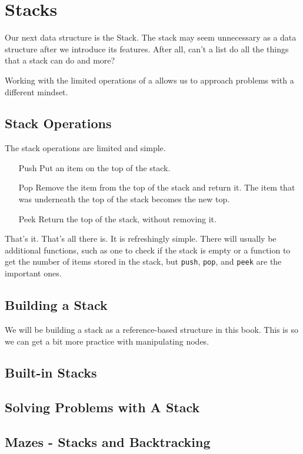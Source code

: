 \chapter{Stacks}
Our next data structure is the Stack.
The stack may seem unnecessary as a data structure after we introduce its features.  
After all, can't a list do all the things that a stack can do and more? 

Working with the limited operations of a allows us to approach problems with a different mindset.

\section{Stack Operations}

The stack operations are limited and simple. 


\begin{enumerate}
	\item[Push] Put an item on the top of the stack.
	\item[Pop]  Remove the item from the top of the stack and return it.  The item that was underneath the top of the stack becomes the new top.
	\item[Peek] Return the top of the stack, without removing it.
\end{enumerate}


That's it.  That's all there is.  It is refreshingly simple.
There will usually be additional functions, such as one to check if the stack is empty or a function to get the number of items stored in the stack, but \texttt{push}, \texttt{pop}, and \texttt{peek} are the important ones.




\section{Building a Stack}

We will be building a stack as a reference-based structure in this book.  This is so we can get a bit more practice with manipulating nodes.


	



\section{Built-in Stacks}

\section{Solving Problems with A Stack}


\section{Mazes - Stacks and Backtracking}




